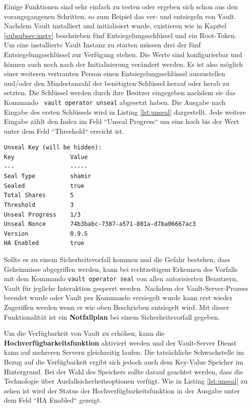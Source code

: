 \documentclass[
book,
a4paper,   
titlepage,  
halfparskip,
12pt        
]{scrartcl}
\newcommand\inline{\lstinline[basicstyle=\ttfamily]}
\begin{document}
\begin{onehalfspacing}
Einige Funktionen sind sehr einfach zu testen oder ergeben sich schon aus den vorangegangenen Schritten, so zum Beipiel das ver- und entsiegeln von Vault. Nachdem Vault installiert und initialisiert wurde, existieren wie in Kapitel \vref{subsubsec:instv} beschrieben fünf Entsiegelungsschlüssel und ein Root-Token. Um eine installierte Vault Instanz zu starten müssen drei der fünf Entsiegelungsschlüssel zur Verfügung stehen. Die Werte sind konfigurierbar und können auch noch nach der Initialisierung verändert werden. Es ist also möglich einer weiteren vertrauten Person einen Entsiegelungsschlüssel auszustellen und/oder den Mindestanzahl der benötigten Schlüssel herauf oder herab zu setzten. Die Schlüssel werden durch ihre Besitzer eingegeben nachdem sie das Kommando \inline| vault operator unseal| abgesetzt haben. Die Ausgabe nach Eingabe des ersten Schlüssels wird in Listing \vref{lst:unseal} dargestellt. Jede weitere Eingabe zählt den Index im Feld ``Unseal Progress`` um eins hoch bis der Wert unter dem Feld ``Threshold`` erreicht ist. 
\begin{lstlisting}[caption={[Entsiegelungsprozess] Erster Schritt im Entsiegelungsprozess von Vault}, label=lst:unseal, captionpos=b, basicstyle=\ttfamily] 
Unseal Key (will be hidden): 
Key                Value
---                -----
Seal Type          shamir
Sealed             true
Total Shares       5
Threshold          3
Unseal Progress    1/3
Unseal Nonce       74b3babc-7387-a571-801a-d7ba06667ac3
Version            0.9.5
HA Enabled         true
\end{lstlisting}
Sollte es zu einem Sicherheitsvorfall kommen und die Gefahr bestehen, dass Geheimnisse abgegriffen werden, kann bei rechtzeitigem Erkennen des Vorfalls mit dem Kommando \inline|vault operator seal| von allen autorisierten Benutzern, Vault für jegliche Interaktion gesperrt werden. Nachdem der Vault-Server-Prozess beendet wurde oder Vault per Kommando versiegelt wurde kann erst wieder Zugeriffen werden wenn er wie oben Beschrieben entsiegelt wird. Mit dieser Funktionalität ist ein \textbf{Notfallplan} bei einem Sicherheitsvorfall gegeben.

Um die Verfügbarkeit von Vault zu erhöhen, kann die \textbf{Hochverfügbarkeitsfunktion} aktiviert werden und der Vault-Server Dienst kann auf mehreren Servern gleichzeitig laufen. Die tatsächliche Schwachstelle im Bezug auf die Verfügbarkeit ergibt sich jedoch auch dem Key-Value Speicher im Hintergrund. Bei der Wahl des Speichers sollte darauf geachtet werden, dass die Technologie über Ausfallsicherheitsoptionen verfügt. Wie in Listing \vref{lst:unseal} zu sehen ist wird der Status der Hochverfügbarkeitsfunktion in der Ausgabe unter dem Feld ``HA Enabled`` gezeigt.


\end{onehalfspacing}
\end{document}
